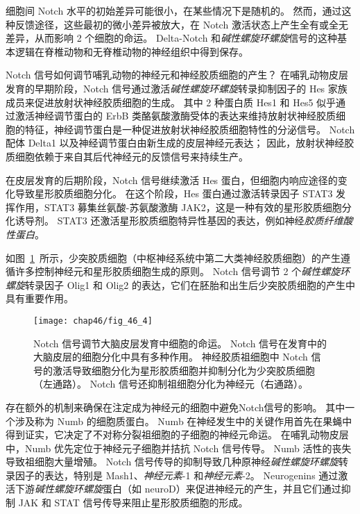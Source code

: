 细胞间 Notch 水平的初始差异可能很小，在某些情况下是随机的。
然而，通过这种反馈途径，这些最初的微小差异被放大，在 Notch 激活状态上产生全有或全无差异，从而影响 2 个细胞的命运。
Delta-Notch 和\textit{碱性螺旋环螺旋}信号的这种基本逻辑在脊椎动物和无脊椎动物的神经组织中得到保存。


Notch 信号如何调节哺乳动物的神经元和神经胶质细胞的产生？
在哺乳动物皮层发育的早期阶段，Notch 信号通过激活\textit{碱性螺旋环螺旋}转录抑制因子的 Hes 家族成员来促进放射状神经胶质细胞的生成。
其中 2 种蛋白质 Hes1 和 Hes5 似乎通过激活神经调节蛋白的 ErbB 类酪氨酸激酶受体的表达来维持放射状神经胶质细胞的特征，神经调节蛋白是一种促进放射状神经胶质细胞特性的分泌信号。
Notch 配体 Delta1 以及神经调节蛋白由新生成的皮层神经元表达；
因此，放射状神经胶质细胞依赖于来自其后代神经元的反馈信号来持续生产。


在皮层发育的后期阶段，Notch 信号继续激活 Hes 蛋白，但细胞内响应途径的变化导致星形胶质细胞分化。
在这个阶段，Hes 蛋白通过激活转录因子 STAT3 发挥作用，STAT3 募集丝氨酸-苏氨酸激酶 JAK2，这是一种有效的星形胶质细胞分化诱导剂。
STAT3 还激活星形胶质细胞特异性基因的表达，例如神经\textit{胶质纤维酸性蛋白}。


如图~\ref{fig:46_4}~所示，少突胶质细胞（中枢神经系统中第二大类神经胶质细胞）的产生遵循许多控制神经元和星形胶质细胞生成的原则。
Notch 信号调节 2 个\textit{碱性螺旋环螺旋}转录因子 Olig1 和 Olig2 的表达，它们在胚胎和出生后少突胶质细胞的产生中具有重要作用。


\begin{figure}[htbp]
	\centering
	\texttt{[image: chap46/fig\_46\_4]}
	\caption{Notch 信号调节大脑皮层发育中细胞的命运。
		Notch 信号在发育中的大脑皮层的细胞分化中具有多种作用。
		神经胶质祖细胞中 Notch 信号的激活导致细胞分化为星形胶质细胞并抑制分化为少突胶质细胞（左通路）。
		Notch 信号还抑制祖细胞分化为神经元（右通路）。}
	\label{fig:46_4}
\end{figure}


存在额外的机制来确保在注定成为神经元的细胞中避免Notch信号的影响。
其中一个涉及称为 Numb 的细胞质蛋白。
Numb 在神经发生中的关键作用首先在果蝇中得到证实，它决定了不对称分裂祖细胞的子细胞的神经元命运。
在哺乳动物皮层中，Numb 优先定位于神经元子细胞并拮抗 Notch 信号传导。
Numb 活性的丧失导致祖细胞大量增殖。
Notch 信号传导的抑制导致几种原神经\textit{碱性螺旋环螺旋}转录因子的表达，特别是 Mash1、\textit{神经元素}-1 和\textit{神经元素}-2。
Neurogenins 通过激活下游\textit{碱性螺旋环螺旋}蛋白（如 neuroD）来促进神经元的产生，并且它们通过抑制 JAK 和 STAT 信号传导来阻止星形胶质细胞的形成。


